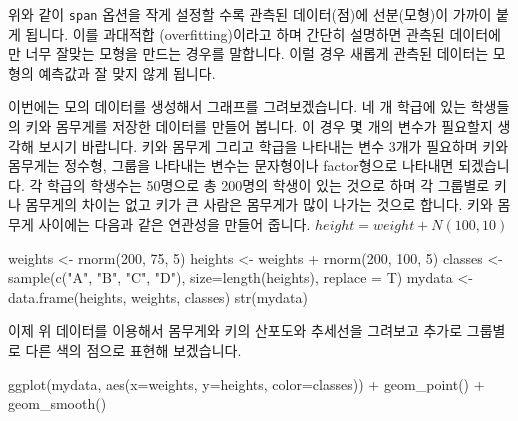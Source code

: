 \documentclass[
]{book}
\newenvironment{Shaded}{\begin{snugshade}}{\end{snugshade}}
\newcommand{\AttributeTok}[1]{\textcolor[rgb]{0.77,0.63,0.00}{#1}}
\newcommand{\DecValTok}[1]{\textcolor[rgb]{0.00,0.00,0.81}{#1}}
\newcommand{\FunctionTok}[1]{\textcolor[rgb]{0.00,0.00,0.00}{#1}}
\newcommand{\NormalTok}[1]{#1}
\newcommand{\OtherTok}[1]{\textcolor[rgb]{0.56,0.35,0.01}{#1}}
\newcommand{\SpecialCharTok}[1]{\textcolor[rgb]{0.00,0.00,0.00}{#1}}
\newcommand{\StringTok}[1]{\textcolor[rgb]{0.31,0.60,0.02}{#1}}
\begin{document}
위와 같이 \texttt{span} 옵션을 작게 설정할 수록 관측된 데이터(점)에 선분(모형)이 가까이 붙게 됩니다. 이를 과대적합 (overfitting)이라고 하며 간단히 설명하면 관측된 데이터에만 너무 잘맞는 모형을 만드는 경우를 말합니다. 이럴 경우 새롭게 관측된 데이터는 모형의 예측값과 잘 맞지 않게 됩니다.

이번에는 모의 데이터를 생성해서 그래프를 그려보겠습니다. 네 개 학급에 있는 학생들의 키와 몸무게를 저장한 데이터를 만들어 봅니다. 이 경우 몇 개의 변수가 필요할지 생각해 보시기 바랍니다. 키와 몸무게 그리고 학급을 나타내는 변수 3개가 필요하며 키와 몸무게는 정수형, 그룹을 나타내는 변수는 문자형이나 factor형으로 나타내면 되겠습니다. 각 학급의 학생수는 50명으로 총 200명의 학생이 있는 것으로 하며 각 그룹별로 키나 몸무게의 차이는 없고 키가 큰 사람은 몸무게가 많이 나가는 것으로 합니다. 키와 몸무게 사이에는 다음과 같은 연관성을 만들어 줍니다. \(height= weight + N(100, 10)\)

\begin{Shaded}
\begin{Highlighting}[]
\NormalTok{weights }\OtherTok{\textless{}{-}} \FunctionTok{rnorm}\NormalTok{(}\DecValTok{200}\NormalTok{, }\DecValTok{75}\NormalTok{, }\DecValTok{5}\NormalTok{)}
\NormalTok{heights }\OtherTok{\textless{}{-}}\NormalTok{ weights }\SpecialCharTok{+} \FunctionTok{rnorm}\NormalTok{(}\DecValTok{200}\NormalTok{, }\DecValTok{100}\NormalTok{, }\DecValTok{5}\NormalTok{)}
\NormalTok{classes }\OtherTok{\textless{}{-}} \FunctionTok{sample}\NormalTok{(}\FunctionTok{c}\NormalTok{(}\StringTok{"A"}\NormalTok{, }\StringTok{"B"}\NormalTok{, }\StringTok{"C"}\NormalTok{, }\StringTok{"D"}\NormalTok{), }\AttributeTok{size=}\FunctionTok{length}\NormalTok{(heights), }\AttributeTok{replace =}\NormalTok{ T)}
\NormalTok{mydata }\OtherTok{\textless{}{-}} \FunctionTok{data.frame}\NormalTok{(heights, weights, classes)}
\FunctionTok{str}\NormalTok{(mydata)}
\end{Highlighting}
\end{Shaded}

이제 위 데이터를 이용해서 몸무게와 키의 산포도와 추세선을 그려보고 추가로 그룹별로 다른 색의 점으로 표현해 보겠습니다.

\begin{Shaded}
\begin{Highlighting}[]
\FunctionTok{ggplot}\NormalTok{(mydata, }\FunctionTok{aes}\NormalTok{(}\AttributeTok{x=}\NormalTok{weights, }\AttributeTok{y=}\NormalTok{heights, }\AttributeTok{color=}\NormalTok{classes)) }\SpecialCharTok{+}
  \FunctionTok{geom\_point}\NormalTok{() }\SpecialCharTok{+}
  \FunctionTok{geom\_smooth}\NormalTok{()}
\end{Highlighting}
\end{Shaded}
\end{document}
